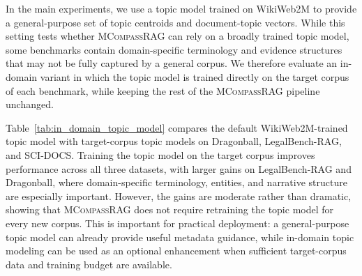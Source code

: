 \documentclass{llmxive}
\providecommand{\name}[1]{\textsc{MCompassRAG}\xspace}
\providecommand{\arraystretch}{1.1}
\begin{document}
In the main experiments, we use a topic model trained on WikiWeb2M to provide a general-purpose set of topic centroids and document-topic vectors. While this setting tests whether \name{} can rely on a broadly trained topic model, some benchmarks contain domain-specific terminology and evidence structures that may not be fully captured by a general corpus. We therefore evaluate an in-domain variant in which the topic model is trained directly on the target corpus of each benchmark, while keeping the rest of the \name{} pipeline unchanged.

Table~\ref{tab:in_domain_topic_model} compares the default WikiWeb2M-trained topic model with target-corpus topic models on Dragonball, LegalBench-RAG, and SCI-DOCS. Training the topic model on the target corpus improves performance across all three datasets, with larger gains on LegalBench-RAG and Dragonball, where domain-specific terminology, entities, and narrative structure are especially important. However, the gains are moderate rather than dramatic, showing that \name{} does not require retraining the topic model for every new corpus. This is important for practical deployment: a general-purpose topic model can already provide useful metadata guidance, while in-domain topic modeling can be used as an optional enhancement when sufficient target-corpus data and training budget are available.

\begin{table}[t]
    \centering
    \setlength{\tabcolsep}{4.0pt}
    \renewcommand{\arraystretch}{1.12}
    \caption{
    Effect of training the topic model on the target corpus. Results report IE$\uparrow$, Precision$\uparrow$, and Recall$\uparrow$, averaged over retrieval cutoffs $k{=}1,3,5$. 
    The WikiWeb2M row corresponds to the main \name{} configuration, while the Target Corpus row trains the topic model on the corresponding benchmark corpus before running the same retrieval pipeline.
    }
    \label{tab:in_domain_topic_model}
\end{table}
\end{document}
